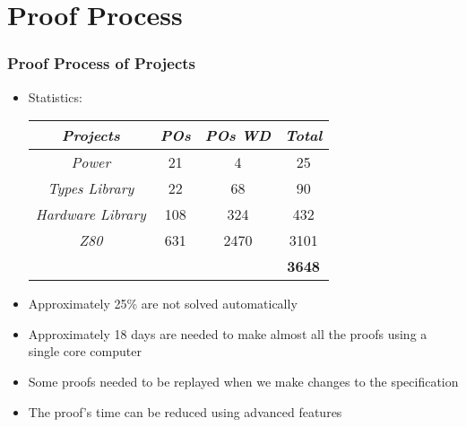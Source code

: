 \section{Proof Process}

\begin{frame}
\frametitle{Proof Process of Projects}

\begin{itemize}
   \item Statistics:\\
    \begin{center}{\footnotesize
  	 \begin{tabular}{|c|c|c|c|}
		\hline
		 \textsl{Projects} &  \textsl{POs}	& \textsl{POs WD} &	\textsl{Total}\\
		\hline
		\textit{Power} & 	21 &	4 &	25\\
		\hline
		\textit{Types Library} &	22 &	68 &	90\\
		\hline
		\textit{Hardware Library} &	108 &	324 &	432\\
		\hline
		\textit{Z80} &	631	 & 2470 & 	3101\\
		\hline
		   &    &  & 		\textbf{3648}\\
		\hline
	 \end{tabular}
   }
	\end{center}

   \item  Approximately 25\% are not solved automatically
	\item Approximately 18 days are needed to make almost all the proofs using a
	single core computer
	\item Some proofs needed to be replayed when we make changes to the specification
	\item The proof's time can be reduced using advanced features
	
	
\end{itemize}

\end{frame}


